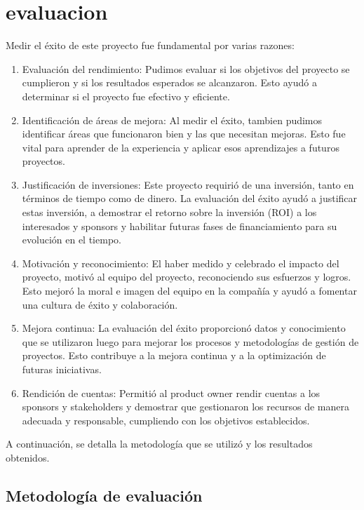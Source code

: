 \chapter{evaluacion}

Medir el éxito de este proyecto fue fundamental por varias razones:

\begin{enumerate}
    \item Evaluación del rendimiento: Pudimos evaluar si los objetivos del proyecto se cumplieron y si los resultados esperados se alcanzaron. Esto ayudó a determinar si el proyecto fue efectivo y eficiente.
    \item Identificación de áreas de mejora: Al medir el éxito, tambien pudimos identificar áreas que funcionaron bien y las que necesitan mejoras. Esto fue vital para aprender de la experiencia y aplicar esos aprendizajes a futuros proyectos.
    \item Justificación de inversiones: Este proyecto requirió de una inversión, tanto en términos de tiempo como de dinero. La evaluación del éxito ayudó a justificar estas inversión, a demostrar el retorno sobre la inversión (ROI) a los interesados y sponsors y habilitar futuras fases de financiamiento para su evolución en el tiempo.
    \item Motivación y reconocimiento: El haber medido y celebrado el impacto del proyecto, motivó al equipo del proyecto, reconociendo sus esfuerzos y logros. Esto mejoró la moral e imagen del equipo en la compañía y ayudó a fomentar una cultura de éxito y colaboración.
    \item Mejora continua: La evaluación del éxito proporcionó datos y conocimiento que se utilizaron luego para mejorar los procesos y metodologías de gestión de proyectos. Esto contribuye a la mejora continua y a la optimización de futuras iniciativas.
    \item Rendición de cuentas: Permitió al product owner rendir cuentas a los sponsors y stakeholders y demostrar que gestionaron los recursos de manera adecuada y responsable, cumpliendo con los objetivos establecidos.
\end{enumerate}

A continuación, se detalla la metodología que se utilizó y los resultados obtenidos.

\section{Metodología de evaluación}

